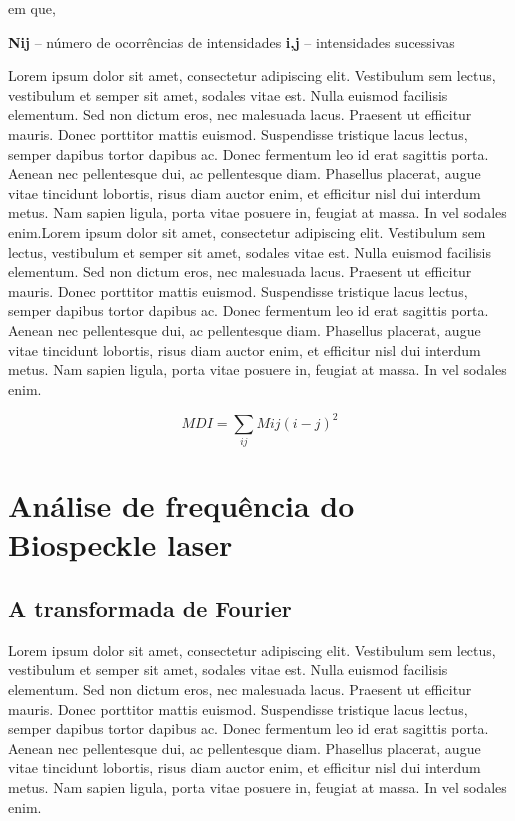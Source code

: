 em que,

\textbf{Nij} – número de ocorrências de intensidades
\textbf{i,j} – intensidades sucessivas

Lorem ipsum dolor sit amet, consectetur adipiscing elit. Vestibulum sem lectus, vestibulum et semper sit amet, sodales vitae est. Nulla euismod facilisis elementum. Sed non dictum eros, nec malesuada lacus. Praesent ut efficitur mauris. Donec porttitor mattis euismod. Suspendisse tristique lacus lectus, semper dapibus tortor dapibus ac. Donec fermentum leo id erat sagittis porta. Aenean nec pellentesque dui, ac pellentesque diam. Phasellus placerat, augue vitae tincidunt lobortis, risus diam auctor enim, et efficitur nisl dui interdum metus. Nam sapien ligula, porta vitae posuere in, feugiat at massa. In vel sodales enim.Lorem ipsum dolor sit amet, consectetur adipiscing elit. Vestibulum sem lectus, vestibulum et semper sit amet, sodales vitae est. Nulla euismod facilisis elementum. Sed non dictum eros, nec malesuada lacus. Praesent ut efficitur mauris. Donec porttitor mattis euismod. Suspendisse tristique lacus lectus, semper dapibus tortor dapibus ac. Donec fermentum leo id erat sagittis porta. Aenean nec pellentesque dui, ac pellentesque diam. Phasellus placerat, augue vitae tincidunt lobortis, risus diam auctor enim, et efficitur nisl dui interdum metus. Nam sapien ligula, porta vitae posuere in, feugiat at massa. In vel sodales enim.

\begin{equation} \label{eq:02}
MDI = \sum_{ij} M ij(i-j)^{2}
\end{equation}

\section{Análise de frequência do Biospeckle laser}


\subsection{A transformada de Fourier}

Lorem ipsum dolor sit amet, consectetur adipiscing elit. Vestibulum sem lectus, vestibulum et semper sit amet, sodales vitae est. Nulla euismod facilisis elementum. Sed non dictum eros, nec malesuada lacus. Praesent ut efficitur mauris. Donec porttitor mattis euismod. Suspendisse tristique lacus lectus, semper dapibus tortor dapibus ac. Donec fermentum leo id erat sagittis porta. Aenean nec pellentesque dui, ac pellentesque diam. Phasellus placerat, augue vitae tincidunt lobortis, risus diam auctor enim, et efficitur nisl dui interdum metus. Nam sapien ligula, porta vitae posuere in, feugiat at massa. In vel sodales enim.

